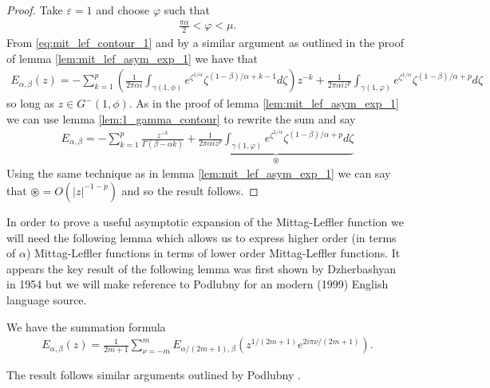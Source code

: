 \begin{proof}
    Take $ \varepsilon = 1 $ and choose $ \varphi $ such that
    \begin{align}
        \frac{\pi \alpha}{2} < \varphi < \mu.
    \end{align}
    From \eqref{eq:mit_lef_contour_1} and by a similar argument as outlined in the proof of lemma \ref{lem:mit_lef_asym_exp_1} we have that
    \begin{align}
        E_{\alpha, \beta}(z) = -\sum_{k=1}^{p} \left( \frac{1}{2\pi\alpha i} \int_{\gamma(1, \phi)} e^{\zeta^{1/\alpha}} \zeta^{(1-\beta)/\alpha + k - 1} d\zeta\right) z^{-k} + \frac{1}{2\pi \alpha i z^p} \int_{\gamma(1, \varphi)} e^{\zeta^{1/\alpha}} \zeta^{(1-\beta)/\alpha + p} d\zeta
    \end{align}
    so long as $ z \in G^-(1, \phi) $. As in the proof of lemma \ref{lem:mit_lef_asym_exp_1} we can use lemma \ref{lem:1_gamma_contour} to rewrite the sum and say
    \begin{align}
        E_{\alpha,\beta} = - \sum_{k=1}^p \frac{z^{-k}}{\Gamma(\beta - \alpha k)} + \underbrace{\frac{1}{2\pi \alpha i z^p} \int_{\gamma(1, \varphi)} e^{\zeta^{1/\alpha}} \zeta^{(1-\beta)/\alpha + p} d\zeta}_{\circledast}
    \end{align}
    Using the same technique as in lemma \ref{lem:mit_lef_asym_exp_1} we can say that $ \circledast = O(|z|^{-1-p}) $ and so the result follows.
\end{proof}
In order to prove a useful asymptotic expansion of the Mittag-Leffler function we will need the following lemma which allows us to express higher order (in terms of $ \alpha $) Mittag-Leffler functions in terms of lower order Mittag-Leffler functions. It appears the key result of the following lemma was first shown by Dzherbashyan \cite{Dzherbashyan1954} in 1954 but we will make reference to Podlubny \cite{Podlubny1999} for an modern (1999) English language source. 
\begin{lemma}
    \label{lem:mit_lef_summation}
    We have the summation formula
    \begin{align}
        E_{\alpha, \beta}(z) = \frac{1}{2m+1} \sum_{\nu=-m}^{m} E_{\alpha / (2m+1), \beta}\left( z^{1/(2m+1)} e^{2i\pi\nu/(2m+1)}\right).
    \end{align}
\end{lemma}
The result follows similar arguments outlined by Podlubny \cite{Podlubny1999}.
